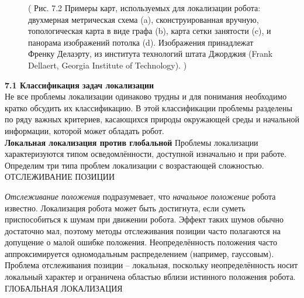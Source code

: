 \documentclass[10pt,a4paper]{article}
\begin{document}
\begin{figure}[H]
	\caption{ (  Рис. 7.2 Примеры карт, используемых для локализации робота: двухмерная метрическая схема (a), сконструированная вручную, топологическая карта в виде графа (b), карта сетки занятости (c), и панорама изображений потолка (d). Изображения принадлежат Френку Делаэрту, из института технологий штата Джорджия (Frank Dellaert, Georgia Institute of Technology).
		)}
	\label{fig:72orig}
\end{figure}

\textbf{7.1 Классификация задач локализации}\\

Не все проблемы локализации одинаково трудны и для понимания необходимо кратко обсудить их классификацию. В этой классификации проблемы разделены по ряду важных критериев, касающихся природы окружающей среды и начальной информации, которой может обладать робот.\\

\textbf{Локальная локализация против глобальной} 
Проблемы локализации характеризуются типом осведомлённости, доступной изначально и при работе. Определим три типа проблем локализации с возрастающей сложностью.\\ 
ОТСЛЕЖИВАНИЕ ПОЗИЦИИ 

\textit{Отслеживание положения} подразумевает, что \textit{начальное положение} робота известно. Локализация робота может быть достигнута, если суметь приспособиться к шумам при движении робота. Эффект таких шумов обычно достаточно мал, поэтому методы отслеживания позиции часто полагаются на допущение о малой ошибке положения. Неопределённость положения часто аппроксимируется одномодальным распределением (например, гауссовым). Проблема отслеживания позиции – локальная, поскольку неопределённость носит локальный характер и ограничена областью вблизи истинного положения робота.\\
ГЛОБАЛЬНАЯ ЛОКАЛИЗАЦИЯ
\end{document}
